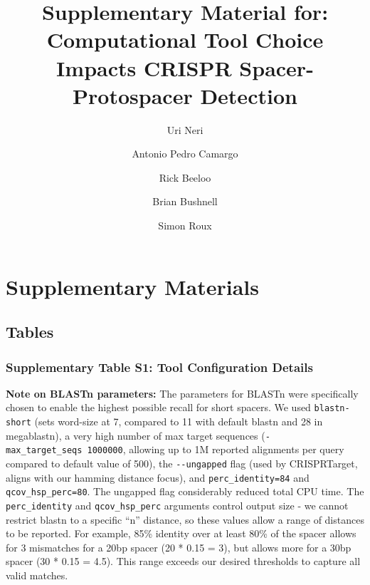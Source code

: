 \documentclass[
]{article}
\title{Supplementary Material for: Computational Tool Choice Impacts
CRISPR Spacer-Protospacer Detection}
\author{Uri Neri \and Antonio Pedro Camargo \and Rick Beeloo \and Brian
Bushnell \and Simon Roux}
\date{}
\begin{document}
\maketitle


\section{Supplementary Materials}\label{supplementary-materials}

\subsection{Tables}\label{tables}

\subsubsection{Supplementary Table S1: Tool Configuration
Details}\label{tbl-supp-tool-config}

\textbf{Note on BLASTn parameters:} The parameters for BLASTn were
specifically chosen to enable the highest possible recall for short
spacers. We used \texttt{blastn-short} (sets word-size at 7, compared to
11 with default blastn and 28 in megablastn), a very high number of max
target sequences (\texttt{-max\_target\_seqs\ 1000000}, allowing up to
1M reported alignments per query compared to default value of 500), the
\texttt{-\/-ungapped} flag (used by CRISPRTarget, aligns with our
hamming distance focus), and \texttt{perc\_identity=84} and
\texttt{qcov\_hsp\_perc=80}. The ungapped flag considerably reduced
total CPU time. The \texttt{perc\_identity} and \texttt{qcov\_hsp\_perc}
arguments control output size - we cannot restrict blastn to a specific
``n'' distance, so these values allow a range of distances to be
reported. For example, 85\% identity over at least 80\% of the spacer
allows for 3 mismatches for a 20bp spacer (20 * 0.15 = 3), but allows
more for a 30bp spacer (30 * 0.15 = 4.5). This range exceeds our desired
thresholds to capture all valid matches.
\end{document}
